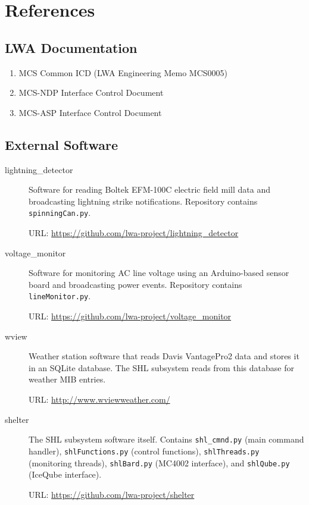 
\chapter{References}
\label{sec:references}

\section{LWA Documentation}

\begin{enumerate}
    \item MCS Common ICD (LWA Engineering Memo MCS0005)
    \item MCS-NDP Interface Control Document
    \item MCS-ASP Interface Control Document
\end{enumerate}

\section{External Software}

\begin{description}
    \item[lightning\_detector] Software for reading Boltek EFM-100C electric field mill data and broadcasting lightning strike notifications. Repository contains \texttt{spinningCan.py}.

    URL: \url{https://github.com/lwa-project/lightning_detector}

    \item[voltage\_monitor] Software for monitoring AC line voltage using an Arduino-based sensor board and broadcasting power events. Repository contains \texttt{lineMonitor.py}.

    URL: \url{https://github.com/lwa-project/voltage_monitor}

    \item[wview] Weather station software that reads Davis VantagePro2 data and stores it in an SQLite database. The SHL subsystem reads from this database for weather MIB entries.

    URL: \url{http://www.wviewweather.com/}

    \item[shelter] The SHL subsystem software itself. Contains \texttt{shl\_cmnd.py} (main command handler), \texttt{shlFunctions.py} (control functions), \texttt{shlThreads.py} (monitoring threads), \texttt{shlBard.py} (MC4002 interface), and \texttt{shlQube.py} (IceQube interface).

    URL: \url{https://github.com/lwa-project/shelter}
\end{description}

